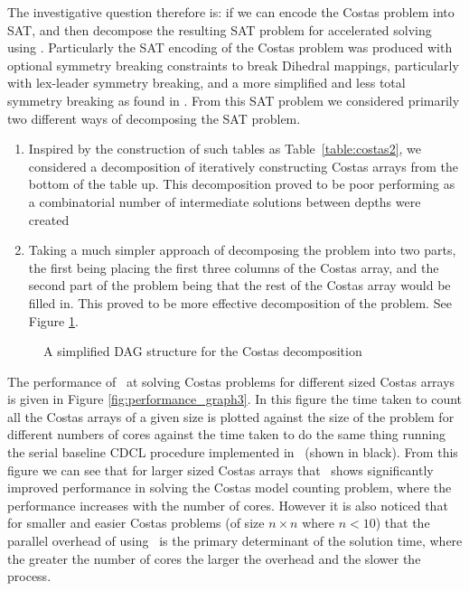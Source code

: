 \documentclass[
10pt, %
a4paper, %
oneside, %
headinclude,footinclude, %
BCOR5mm, %
]{scrartcl}
\begin{document}
The investigative question therefore is: if we can encode the Costas problem into SAT, and then decompose the resulting SAT problem for accelerated solving using \dagster.
Particularly the SAT encoding of the Costas problem was produced with optional symmetry breaking constraints to break Dihedral mappings, particularly with lex-leader symmetry breaking, and a more simplified and less total symmetry breaking as found in \cite{conf/ciss/RussoEB10}.
From this SAT problem we considered primarily two different ways of decomposing the SAT problem.
\begin{enumerate}
\item	Inspired by the construction of such tables as Table~\ref{table:costas2}, we considered a decomposition of iteratively constructing Costas arrays from the bottom of the table up. This decomposition proved to be poor performing as a combinatorial number of intermediate solutions between depths were created
\item	Taking a much simpler approach of decomposing the problem into two parts, the first being placing the first three columns of the Costas array, and the second part of the problem being that the rest of the Costas array would be filled in. This proved to be more effective decomposition of the problem. See Figure \ref{fig:dag_example121}.
\end{enumerate}

\begin{figure}[h]
\centering
{}
\caption{A simplified DAG structure for the Costas decomposition}\label{fig:dag_example121}
\end{figure}

The performance of \dagster\ at solving Costas problems for different sized Costas arrays is given in Figure \ref{fig:performance_graph3}.
In this figure the time taken to count all the Costas arrays of a given size is plotted against the size of the problem for different numbers of cores against the time taken to do the same thing running the serial baseline CDCL procedure implemented in \tinisat\ (shown in black).
From this figure we can see that for larger sized Costas arrays that \dagster\ shows significantly improved performance in solving the Costas model counting problem, where the performance increases with the number of cores.
However it is also noticed that for smaller and easier Costas problems (of size $n\times n$ where $n<10$) that the parallel overhead of using \dagster\ is the primary determinant of the solution time, where the greater the number of cores the larger the overhead and the slower the process.
\end{document}
